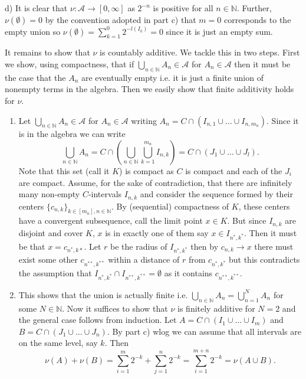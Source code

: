 \documentclass[12pt]{amsart} %
\def\N{\mathbb{N}}
\def\A{\mathcal{A}}
\begin{document}
\smallskip
d) It is clear that $\nu: \A \to [0,\infty]$ as $2^{-n}$ is positive for all $n \in \N$. Further, $\nu(\emptyset) = 0$ by the convention adopted in part c) that $m=0$ corresponds to the empty union so  $\nu(\emptyset) = \sum_{k=1}^{0} 2^{-l(I_k)} = 0$ since it is just an empty sum. 

It remains to show that $\nu$ is countably additive. We tackle this in two steps. First we show, using compactness, that if $\bigcup_{n \in \N}{A_n} \in \A$ for $A_n \in \A$ then it must be the case that the $A_n$ are eventually empty i.e. it is just a finite union of nonempty terms in the algebra. Then we easily show that finite additivity holds for $\nu$.

\begin{enumerate}
	\item Let $\bigcup_{n \in \N} A_n \in \A$ for $A_n \in \A$ writing 		$A_n = C \cap \left( I_{n,1} \cup \ldots \cup I_{n,m_n} \right)$. Since it is in the algebra we can write $$\bigcup_{n \in \N} A_n = C \cap \left( \bigcup_{n \in \N}\bigcup_{k=1}^{m_n} I_{n,k} \right) = C \cap \left( J_1 \cup \ldots\cup J_l \right).$$ Note that this set (call it $K$) is compact as $C$ is compact and each of the  $J_i$ are compact. Assume, for the sake of contradiction, that there are infinitely many non-empty $C$-intervals  $I_{n,k}$ and consider the sequence formed by their centers $\{c_{n,k}\}_{k \in [m_n], n \in \N}$. By (sequential) compactness of $K$, these centers have a convergent subsequence, call the limit point $x \in K$. But since $I_{n,k}$ are disjoint and cover $K$,  $x$ is in exactly one of them say  $x \in I_{n^*,k^*}$. Then it must be that $x = c_{n^*, k*}$. Let  $r$ be the radius of  $I_{n^*, k^*}$ then by  $c_{n,k} \to x$ there must exist some other $c_{n^{**}, k^{**}}$ within a distance of $r$ from  $c_{n^*, k^*}$ but this contradicts the assumption that $I_{n^*, k^*} \cap I_{n^{**}, k^{**}} = \emptyset$ as it contains $c_{n^{**}, k^{**}}$.
	\item This shows that the union is actually finite i.e. $\bigcup_{n \in \N}A_n =  \bigcup_{n = 1}^N A_n $ for some $N \in \N$. Now it suffices to show that $\nu$ is finitely additive for $N=2$ and the general case follows from induction. Let $A = C\cap \left( I_1 \cup \ldots\cup I_m \right)$ and $B = C \cap \left( J_1 \cup \ldots\cup J_n\right) $. By part c) wlog we can assume that all intervals are on the same level, say $k$. Then  $$\nu(A) + \nu(B) = \sum_{i=1}^{m} 2^{-k} + \sum_{j=1}^{n} 2^{-k}  = \sum_{i=1}^{m+n} 2^{-k} = \nu(A \cup B).$$
\end{enumerate}
\end{document}

